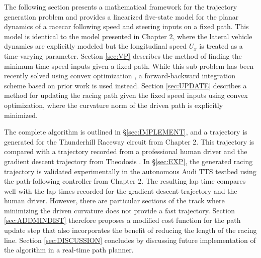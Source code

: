  The following section presents a mathematical framework for the trajectory generation
 problem and provides a linearized five-state model for the planar dynamics of a racecar following speed and steering inputs on a fixed path. 
 This model is identical to the model presented in Chapter 2, where the lateral vehicle dynamics are explicitly
 modeled but the longitudinal speed $U_x$ is treated as a time-varying parameter. 
 Section \ref{sec:VP} describes the method of finding the minimum-time speed inputs given a fixed path. 
 While this sub-problem has been recently solved using convex optimization \cite{lipp}, a forward-backward
 integration scheme based on prior work \cite{subosits} is used instead.  Section \ref{sec:UPDATE} describes
 a method for updating the racing path given the fixed speed inputs using convex optimization, 
 where the curvature norm  of the driven path is explicitly minimized. 
 
 The complete algorithm is outlined in \S \ref{sec:IMPLEMENT}, and a trajectory is generated for the Thunderhill Raceway circuit
 from Chapter 2. This trajectory is compared with a trajectory recorded from a professional human driver and the gradient descent
 trajectory from Theodosis \cite{theodosis}. In \S \ref{sec:EXP}, the generated racing trajectory is validated experimentally in
 the autonomous Audi TTS testbed using the path-following controller from Chapter 2. The resulting lap time compares well with the lap times
 recorded for the gradient descent trajectory and the human driver. However, there are particular sections of the track where minimizing the driven
 curvature does not provide a fast trajectory. Section \ref{sec:ADDMINDIST} therefore proposes a modified cost function for the path update
 step that also incorporates the benefit of reducing the length of the racing line. Section \ref{sec:DISCUSSION} concludes by discussing 
 future implementation of the algorithm in a real-time path planner.  

